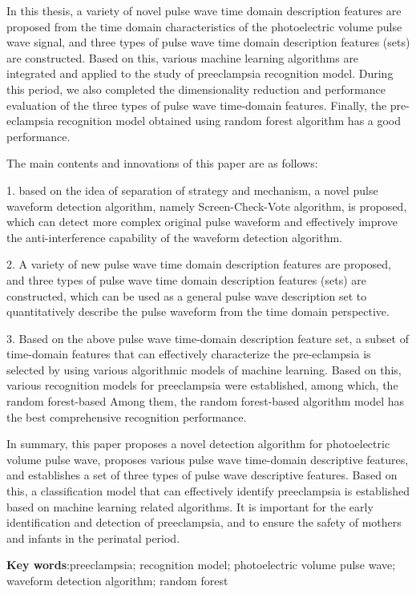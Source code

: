 In this thesis, a variety of novel pulse wave time domain description features are proposed from the time domain characteristics of the photoelectric volume pulse wave signal, and three types of pulse wave time domain description features (sets) are constructed. Based on this, various machine learning algorithms are integrated and applied to the study of preeclampsia recognition model.
During this period, we also completed the dimensionality reduction and performance evaluation of the three types of pulse wave time-domain features. Finally, the pre-eclampsia recognition model obtained using random forest algorithm has a good performance.

The main contents and innovations of this paper are as follows:

1. based on the idea of separation of strategy and mechanism, a novel pulse waveform detection algorithm, namely Screen-Check-Vote algorithm, is proposed, which can detect more complex original pulse waveform and effectively improve the anti-interference capability of the waveform detection algorithm.

2. A variety of new pulse wave time domain description features are proposed, and three types of pulse wave time domain description features (sets) are constructed, which can be used as a general pulse wave description set to quantitatively describe the pulse waveform from the time domain perspective.

3. Based on the above pulse wave time-domain description feature set, a subset of time-domain features that can effectively characterize the pre-eclampsia is selected by using various algorithmic models of machine learning. Based on this, various recognition models for preeclampsia were established, among which, the random forest-based
Among them, the random forest-based algorithm model has the best comprehensive recognition performance.

In summary, this paper proposes a novel detection algorithm for photoelectric volume pulse wave, proposes various pulse wave time-domain descriptive features, and establishes a set of three types of pulse wave descriptive features. Based on this, a classification model that can effectively identify preeclampsia is established based on machine learning related algorithms.
It is important for the early identification and detection of preeclampsia, and to ensure the safety of mothers and infants in the perinatal period.


\textbf{Key words}:preeclampsia; recognition model; photoelectric volume pulse wave; waveform detection algorithm; random forest